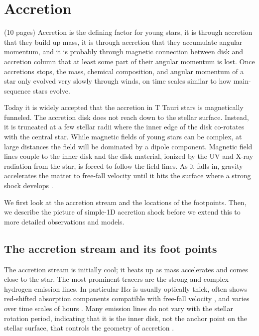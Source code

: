 


\section{Accretion \label{sect:accretion}}
{\color{blue}(10 pages)}
Accretion is the defining factor for young stars, it is through accretion that they build up mass, it is through accretion that they accumulate angular momentum, and it is probably through magnetic connection between disk and accretion column that at least some part of their angular momentum is lost. Once accretions stops, the mass, chemical composition, and angular momentum of a star only evolved very slowly through winds, on time scales similar to how main-sequence stars evolve.

Today it is widely accepted that the accretion in T Tauri stars is magnetically funneled. The accretion disk does not reach down to the stellar surface. Instead, it is truncated at a few stellar radii where the inner edge of the disk co-rotates with the central star. While magnetic fields of young stars can be complex, at large distances the field will be dominated by a dipole component. Magnetic field lines couple to the inner disk and the disk material, ionized by the UV and X-ray radiation from the star, is forced to follow the field lines. As it falls in, gravity accelerates the matter to free-fall velocity until it hits the surface where a strong shock develops \cite{shu_94}. 

We first look at the accretion stream and the locations of the footpoints. Then, we describe the picture of simple-1D accretion shock  before we extend this to more detailed observations and models.

\subsection{The accretion stream and its foot points}
\label{sect:accretionsrteam}
The accretion stream is initially cool; it heats up as mass accelerates and comes close to the star. The most prominent tracers are the strong and complex hydrogen emission lines. In particular H$\alpha$ is usually optically thick, often shows red-shifted absorption components compatible with free-fall velocity \cite[e.g.][]{2000AJ....119.1881A}, and varies over time scales of hours \cite{dupree_2012}. Many emission lines do not vary with the stellar rotation period, indicating that it is the inner disk, not the anchor point on the stellar surface, that controls the geometry of accretion \cite{2021A&A...649A..68S}.

